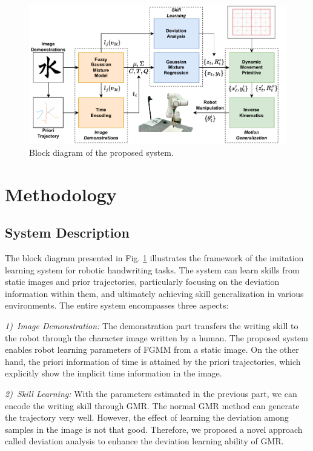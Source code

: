 \documentclass[journal]{IEEEtran}
\begin{document}
\begin{figure}[!t]
    \centering
    \includegraphics[width=6in]{./fig/fig1.pdf}
    \caption{Block diagram of the proposed system.}
    \label{fig1}
\end{figure}

\section{Methodology}
\subsection{System Description}
The block diagram presented in Fig. \ref{fig1} illustrates the framework of the imitation learning system for robotic handwriting tasks. The system can learn skills from static images and prior trajectories, particularly focusing on the deviation information within them, and ultimately achieving skill generalization in various environments. The entire system encompasses three aspects:

\emph{1)~Image Demonstration:} The demonstration part transfers the writing skill to the robot through the character image written by a human. The proposed system enables robot learning parameters of FGMM from a static image. On the other hand, the priori information of time is attained by the priori trajectories, which explicitly show the implicit time information in the image.

\emph{2)~Skill Learning:} With the parameters estimated in the previous part, we can encode the writing skill through GMR. The normal GMR method can generate the trajectory very well. However, the effect of learning the deviation among samples in the image is not that good. Therefore, we proposed a novel approach called deviation analysis to enhance the deviation learning ability of GMR. 
\end{document}
